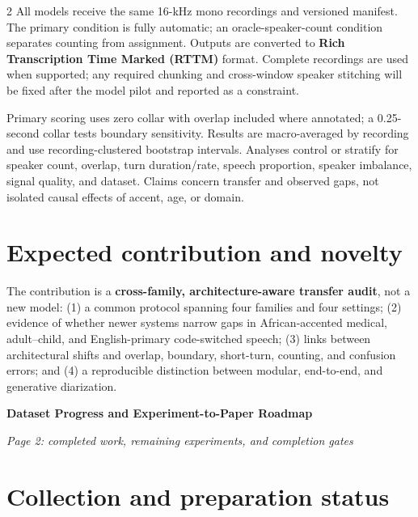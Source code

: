 \documentclass[9pt]{extarticle}
\begin{document}
\begin{multicols}{2}
All models receive the same 16-kHz mono recordings and versioned manifest. The
primary condition is fully automatic; an oracle-speaker-count condition
separates counting from assignment. Outputs are converted to \textbf{Rich
Transcription Time Marked (RTTM)} format. Complete recordings are used when
supported; any required chunking and cross-window speaker stitching will be
fixed after the model pilot and reported as a constraint.

Primary scoring uses zero collar with overlap included where annotated; a
0.25-second collar tests boundary sensitivity. Results are macro-averaged by
recording and use recording-clustered bootstrap intervals. Analyses control or
stratify for speaker count, overlap, turn duration/rate, speech proportion,
speaker imbalance, signal quality, and dataset. Claims concern transfer and
observed gaps, not isolated causal effects of accent, age, or domain.

\section*{Expected contribution and novelty}

The contribution is a \textbf{cross-family, architecture-aware transfer
audit}, not a new model: (1) a common protocol spanning four families and four
settings; (2) evidence of whether newer systems narrow gaps in
African-accented medical, adult--child, and English-primary code-switched
speech; (3) links between architectural shifts and overlap, boundary,
short-turn, counting, and confusion errors; and (4) a reproducible distinction
between modular, end-to-end, and generative diarization.

\end{multicols}

\newpage

\begin{center}
  {\fontsize{14}{15.5}\selectfont\bfseries Dataset Progress and
  Experiment-to-Paper Roadmap}

  \vspace{1.5pt}
  {\itshape Page 2: completed work, remaining experiments, and completion gates}
\end{center}

\section*{Collection and preparation status}
\end{document}
